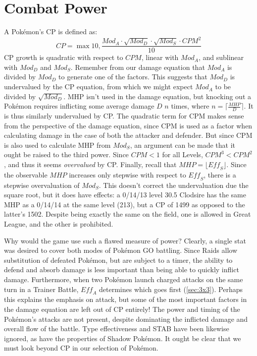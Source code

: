 \section{Combat Power\label{sec:cp}}
A Pokémon's CP is defined as:
\[ CP = \max{10, \frac{Mod_A \cdot \sqrt{Mod_D} \cdot \sqrt{Mod_S} \cdot CPM^2}{10}} \]
CP growth is quadratic with respect to $CPM$, linear with $Mod_A$, and
  sublinear with $Mod_D$ and $Mod_S$.
Remember from our damage equation that $Mod_A$ is divided by $Mod_D$
 to generate one of the factors.
This suggests that $Mod_D$ is undervalued by the CP equation, from which
 we might expect $Mod_A$ to be divided by $\sqrt{Mod_D}$.
MHP isn't used in the damage equation, but knocking out a Pokémon
 requires inflicting some average damage $D$ $n$ times,
 where $n = \lceil\frac{MHP}{D}\rceil$.
It is thus similarly undervalued by CP\@.
The quadratic term for CPM makes sense from the perspective of the damage
 equation, since CPM is used as a factor when calculating damage in the
 case of both the attacker and defender.
But since CPM is also used to calculate MHP from $Mod_S$, an argument
 can be made that it ought be raised to the third power.
Since $CPM < 1$ for all Levels, $CPM^3 < CPM^2$, and thus it seems \textit{overvalued} by CP\@.
Finally, recall that $MHP = \lfloor \mathit{Eff_S} \rfloor$.
Since the observable $MHP$ increases only stepwise with respect to $\mathit{Eff_S}$,
  there is a stepwise overvaluation of $Mod_S$.
This doesn't correct the undervaluation due the square root, but it does
  have effects: a 0/14/13 level 30.5 Clodsire has the same MHP
  as a 0/14/14 at the same level (213), but a CP of 1499 as
  opposed to the latter's 1502.
Despite being exactly the same on the field, one is allowed in Great League,
  and the other is prohibited.

Why would the game use such a flawed measure of power?
Clearly, a single stat was desired to cover both modes of Pokémon GO battling.
Since Raids allow substitution of defeated Pokémon, but are subject to a timer,
  the ability to defend and absorb damage is less important than being able to
  quickly inflict damage.
Furthermore, when two Pokémon launch charged attacks on the same turn in a Trainer
  Battle, $\mathit{Eff_A}$ determines which goes first (\autoref{sec:3x3}).
Perhaps this explains the emphasis on attack, but some of the most important
  factors in the damage equation are left out of CP entirely!
The power and timing of the Pokémon's attacks are not present, despite
  dominating the inflicted damage and overall flow of the battle.
Type effectiveness and STAB have been likewise ignored, as have the
  properties of Shadow Pokémon.
It ought be clear that we must look beyond CP in our selection of Pokémon.

